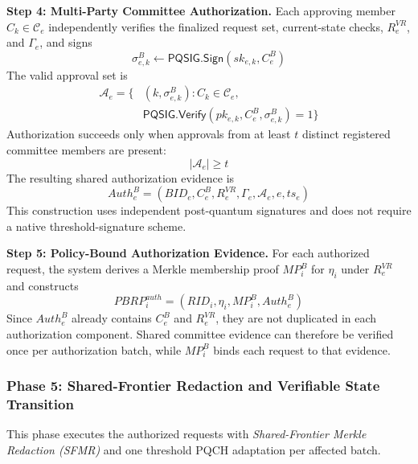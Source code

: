 \documentclass[lettersize,journal]{IEEEtran}
\begin{document}
\medskip
\noindent\textbf{Step 4: Multi-Party Committee Authorization.}
Each approving member $C_k\in\mathcal{C}_e$ independently verifies the
finalized request set, current-state checks, $R_e^{VR}$, and
$\Gamma_e$, and signs
\begin{equation}
\sigma_{e,k}^{B}
\leftarrow
\mathsf{PQSIG.Sign}
\left(
sk_{e,k},C_e^{B}
\right)
\end{equation}
The valid approval set is
\begin{equation}
\begin{aligned}
\mathcal{A}_e=\big\{&
(k,\sigma_{e,k}^{B}):
C_k\in\mathcal{C}_e,\\
&
\mathsf{PQSIG.Verify}
(pk_{e,k},C_e^{B},\sigma_{e,k}^{B})=1
\big\}
\end{aligned}
\end{equation}
Authorization succeeds only when approvals from at least $t$ distinct
registered committee members are present:
\begin{equation}
|\mathcal{A}_e|\geq t
\end{equation}
The resulting shared authorization evidence is
\begin{equation}
Auth_e^{B}
=
(BID_e,C_e^{B},R_e^{VR},\Gamma_e,
\mathcal{A}_e,e,ts_e)
\end{equation}
This construction uses independent post-quantum signatures and does not
require a native threshold-signature scheme.

\medskip
\noindent\textbf{Step 5: Policy-Bound Authorization Evidence.}
For each authorized request, the system derives a Merkle membership
proof $MP_i^{B}$ for $\eta_i$ under $R_e^{VR}$ and constructs
\begin{equation}
PBRP_i^{auth}
=
(RID_i,\eta_i,MP_i^{B},Auth_e^{B})
\end{equation}
Since $Auth_e^{B}$ already contains $C_e^{B}$ and $R_e^{VR}$, they are
not duplicated in each authorization component. Shared committee
evidence can therefore be verified once per authorization batch, while
$MP_i^{B}$ binds each request to that evidence.    
 \subsubsection*{\textbf{Phase 5: Shared-Frontier Redaction and
Verifiable State Transition}}

This phase executes the authorized requests with \emph{Shared-Frontier
Merkle Redaction (SFMR)} and one threshold PQCH adaptation per affected
batch.
\end{document}
